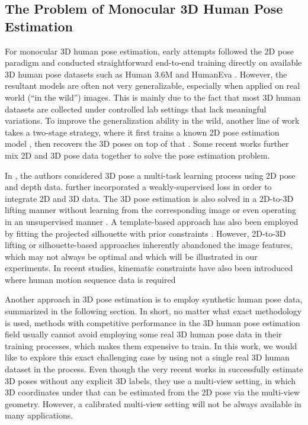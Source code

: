 \documentclass[twocolumn]{svjour3}          \smartqed  \usepackage{graphicx}
\begin{document}
\subsection{The Problem of Monocular 3D Human Pose Estimation}
For monocular 3D human pose estimation, early attempts followed the 2D pose paradigm and conducted straightforward end-to-end training directly on available 3D human pose datasets such as Human 3.6M \cite{h36m_pami} and HumanEva \cite{sigal2010humaneva}. 
However, the resultant models are often not very generalizable, especially when applied on real world (``in the wild'') images.  This is mainly due to the fact that most 3D human datasets are collected under controlled lab settings that lack meaningful variations.
To improve the generalization ability in the wild,  another line of work takes a two-stage strategy, where it first trains a known 2D pose estimation model \cite{newell2016stacked}, then recovers the 3D poses on top of that \cite{zhou20153d}. Some recent works further mix 2D and 3D pose data together to solve the pose
estimation problem. 

In \cite{popa2017deep}, the authors considered 3D pose a multi-task learning process using 2D pose and depth data. \cite{zhou2017towards} further incorporated a weakly-supervised loss in order to integrate 2D and 3D data. The 3D pose estimation is also solved in a 2D-to-3D lifting manner without learning from the corresponding image or even operating in an unsupervised manner \cite{chen2019unsupervised}. 
A template-based approach has also been employed by fitting the projected silhouette with prior constraints \cite{bogo2016keep}. However, 2D-to-3D lifting or silhouette-based approaches inherently abandoned the image features, which may not always be optimal and which will be illustrated in our experiments. In recent studies, kinematic constraints have also been introduced where human motion sequence data is required \cite{Xu_2020_CVPR,pavllo:videopose3d:2019}

Another approach in 3D pose estimation is to employ synthetic human pose data, summarized  in the following section. In short, no matter what exact methodology is used, methods with competitive performance in the 3D human pose estimation field usually cannot avoid employing some real 3D human pose data in their training processes, which makes them expensive to train. 
In this work, we would like to explore this exact challenging case by using not a single real 3D human dataset in the process. 
Even though the very recent works in \cite{kocabas2019self,Remelli_2020_CVPR,Iqbal_2020_CVPR} successfully estimate 3D poses without any explicit 3D labels, they use a multi-view setting, in which 3D coordinates under that can be  estimated from the 2D pose via the multi-view geometry. However, a calibrated multi-view setting will not be always available in many applications.   
\end{document}

